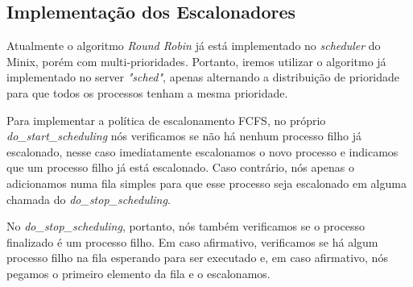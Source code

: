 \documentclass[12pt,journal,compsoc]{IEEEtran}
\begin{document}
\subsection{Implementação dos Escalonadores}
	Atualmente o algoritmo \textit{Round Robin} já está implementado no \textit{scheduler} do Minix, porém com multi-prioridades\cite{MinixSched:Minix3}. Portanto, iremos utilizar o algoritmo já implementado no server \textit{"sched"}, apenas alternando a distribuição de prioridade para que todos os processos tenham a mesma prioridade.
    
    Para implementar a política de escalonamento FCFS, no próprio \textit{do\_start\_scheduling} nós verificamos se não há nenhum processo filho já escalonado, nesse caso imediatamente escalonamos o novo processo e indicamos que um processo filho já está escalonado. Caso contrário, nós apenas o adicionamos numa fila simples para que esse processo seja escalonado em alguma chamada do \textit{do\_stop\_scheduling}.
    
No \textit{do\_stop\_scheduling}, portanto, nós também verificamos se o processo finalizado é um processo filho. Em caso afirmativo, verificamos se há algum processo filho na fila esperando para ser executado e, em caso afirmativo, nós pegamos o primeiro elemento da fila e o escalonamos.

    
\end{document}
